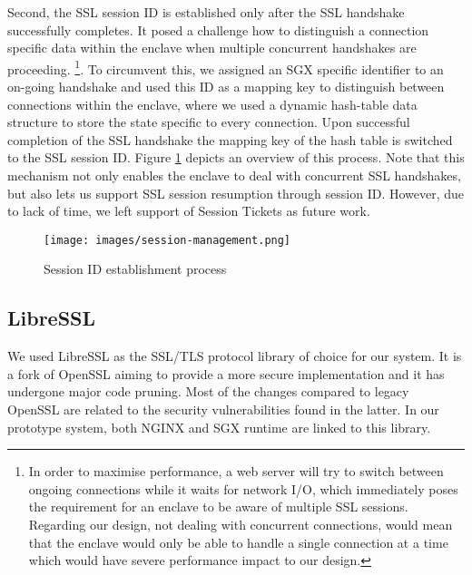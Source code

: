 \documentclass[../main.tex]{subfiles}
\begin{document}
Second, the SSL session ID is established only after the SSL handshake successfully completes. It posed a challenge how to distinguish a connection
specific data within the enclave when multiple concurrent handshakes are
proceeding. \footnote{In order to maximise performance, a web server will try
to switch between ongoing connections while it waits for network I/O, which
immediately poses the requirement for an enclave to be aware of multiple SSL
sessions. Regarding our design, not dealing with concurrent connections, would
mean that the  enclave would only be able to handle a single connection at
a time which would have severe performance impact to our design.}.
To circumvent this, we assigned an SGX specific identifier to an on-going
handshake and used this ID as a mapping key to distinguish between connections
within the enclave, where we used a dynamic hash-table data structure to store
the state specific to every connection. Upon successful completion of the SSL
handshake the mapping key of the hash table is switched to the SSL session ID.
Figure \ref{fig:session-management} depicts an overview of this process. Note
that this mechanism not only enables the enclave to deal with concurrent SSL
handshakes, but also lets us support SSL session resumption through session ID.
However, due to lack of time, we left support of Session Tickets as future
work. 

\begin{figure}[H]
  \centering
  \texttt{[image: images/session-management.png]}
  \caption{Session ID establishment process}
  \label{fig:session-management}
\end{figure}

\subsection{LibreSSL}
\label{subsec:libressl}
We used LibreSSL as the SSL/TLS protocol library of choice for our system. It
is a fork of OpenSSL aiming to provide a more secure implementation and it has
undergone major code pruning. Most of the changes compared to legacy OpenSSL
are related to the security vulnerabilities found in the latter. In our
prototype system, both NGINX and SGX runtime are linked to this library.
\end{document}
